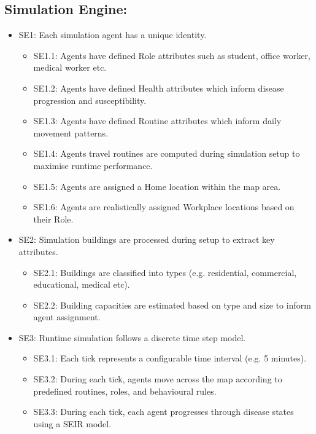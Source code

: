 \subsection{Simulation Engine:}
\begin{itemize}
    \item\label{req:SE1} SE1: Each simulation agent has a unique identity.
    \begin{itemize}
        \item \label{req:SE1.1} SE1.1: Agents have defined Role attributes such as student, office worker, medical worker etc.
        \item \label{req:SE1.2} SE1.2: Agents have defined Health attributes which inform disease progression and susceptibility.
        \item \label{req:SE1.3} SE1.3: Agents have defined Routine attributes which inform daily movement patterns.
        \item \label{req:SE1.4} SE1.4: Agents travel routines are computed during simulation setup to maximise runtime performance.
        \item \label{req:SE1.5} SE1.5: Agents are assigned a Home location within the map area.
        \item \label{req:SE1.6} SE1.6: Agents are realistically assigned Workplace locations based on their Role.
    \end{itemize}
    \item\label{req:SE2} SE2: Simulation buildings are processed during setup to extract key attributes.
    \begin{itemize}
        \item \label{req:SE2.1} SE2.1: Buildings are classified into types (e.g. residential, commercial, educational, medical etc).
        \item \label{req:SE2.2} SE2.2: Building capacities are estimated based on type and size to inform agent assignment.
    \end{itemize}
    \item\label{req:SE3} SE3: Runtime simulation follows a discrete time step model.
    \begin{itemize}
        \item \label{req:SE3.1} SE3.1: Each tick represents a configurable time interval (e.g. 5 minutes).
        \item \label{req:SE3.2} SE3.2: During each tick, agents move across the map according to predefined routines, roles, and behavioural rules.
        \item \label{req:SE3.3} SE3.3: During each tick, each agent progresses through disease states using a SEIR model.

\end{itemize}
\end{itemize}
